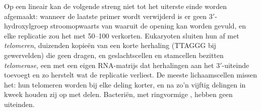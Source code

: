 \begin{proposition}\label{prop:b1:replication-mitosis:telomerase}
Op een lineair  kan de volgende streng niet tot het uiterste einde worden
afgemaakt: wanneer de laatste primer wordt verwijderd is er geen
$3'$-hydroxylgroep stroomopwaarts van waaruit de opening kan worden gevuld, en elke
replicatie zou het  met \qtyrange{50}{100}{}  verkorten.
Eukaryoten sluiten hun  af met \emph{telomeren}, duizenden kopieën van
een korte herhaling (TTAGGG bij gewervelden) die geen  dragen, en
geslachtscellen en stamcellen bezitten \emph{telomerase}, een  met een eigen
RNA-matrijs dat herhalingen aan het $3'$-uiteinde toevoegt en zo herstelt wat de
replicatie verliest. De meeste lichaamscellen missen het: hun telomeren worden bij
elke deling korter, en na zo'n vijftig delingen in kweek houden zij op met delen.
Bacteriën, met ringvormige , hebben geen uiteinden.
\end{proposition}

